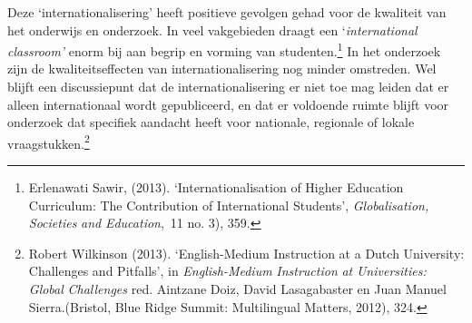 \documentclass[smallauthor, chapterhaspagenum, nochapterinheader, pagenuminheader,  bigchapnum,medium2, tocpages,  garamond, titleinheader]{jote-book}
\begin{document}
	Deze ‘internationalisering' heeft positieve gevolgen gehad voor de kwaliteit van het onderwijs en onderzoek. In veel vakgebieden draagt een ‘\emph{international}\emph{ classroom}\emph{'} enorm bij aan begrip en vorming van studenten.\footnote{Erlenawati Sawir, (2013). ‘Internationalisation of Higher Education Curriculum: The Contribution of International Students', \emph{Globalisation}\emph{, }\emph{Societies}\emph{ }\emph{and}\emph{ }\emph{Education}, 11 no. 3), 359. } In het onderzoek zijn de kwaliteitseffecten van internationalisering nog minder omstreden. Wel blijft een discussiepunt dat de internationalisering er niet toe mag leiden dat er alleen internationaal wordt gepubliceerd, en dat er voldoende ruimte blijft voor onderzoek dat specifiek aandacht heeft voor nationale, regionale of lokale vraagstukken.\footnote{Robert Wilkinson (2013). ‘English-Medium Instruction at a Dutch University: Challenges and Pitfalls', in \emph{English-Medium }\emph{Instruction}\emph{ at }\emph{Universities}\emph{: Global }\emph{Challenges} red.\emph{ }Aintzane Doiz, David Lasagabaster en Juan Manuel Sierra.(Bristol, Blue Ridge Summit: Multilingual Matters, 2012), 324. }
\end{document}
